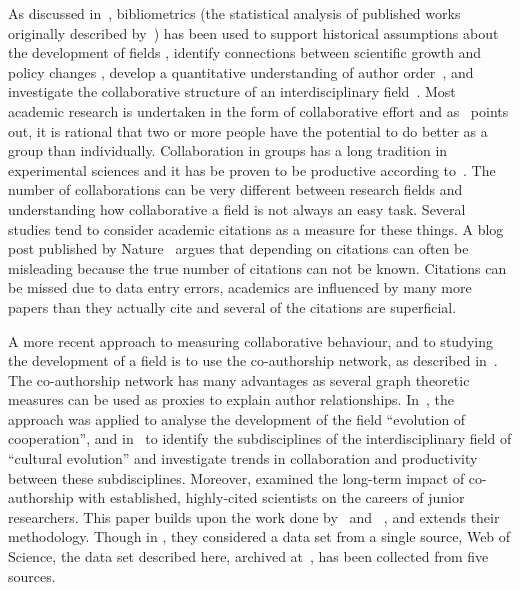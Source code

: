 \documentclass{article}
\theoremstyle{definition}
\begin{document}
As discussed in~\cite{youngblood2018}, bibliometrics (the statistical analysis
of published works originally described by~\cite{pritchard1969}) has been used
to support historical assumptions about the development of fields
\cite{raina1998}, identify connections between scientific growth and policy
changes \cite{das2016}, develop a quantitative understanding of author
order~\cite{sekara2018}, and investigate the collaborative structure of an
interdisciplinary field~\cite{Liu2015}. Most academic research is undertaken in
the form of collaborative effort and as~\cite{Kyvik2017} points out, it is
rational that two or more people have the potential to do better as a group
than individually. Collaboration in groups has a long tradition in experimental
sciences and it has be proven to be productive according
to~\cite{Etzkowitz1992}. The number of collaborations can be very different
between research fields and understanding how collaborative a field is not
always an easy task. Several studies tend to consider academic citations as a
measure for these things. A blog post published by Nature~\cite{nature_blog}
argues that depending on citations can often be misleading because the true
number of citations can not be known. Citations can be missed due to data entry
errors, academics are influenced by many more papers than they actually cite and
several of the citations are superficial.

A more recent approach to measuring collaborative behaviour, and to studying the
development of a field is to use the co-authorship network, as described
in~\cite{Liu2015}. The co-authorship network has many advantages as several
graph theoretic measures can be used as proxies to explain author relationships.
In~\cite{Liu2015}, the approach was applied to analyse the development of the field
``evolution of cooperation'', and in~\cite{youngblood2018} to identify the
subdisciplines of the interdisciplinary field of ``cultural evolution'' and
investigate trends in collaboration and productivity between these subdisciplines.
Moreover, \cite{Li2019} examined the
long-term impact of co-authorship with established, highly-cited scientists on
the careers of junior researchers. This paper builds upon the work done
by~\cite{Liu2015} and ~\cite{youngblood2018}, and extends their methodology.
Though in \cite{Liu2015, youngblood2018}, they considered a data set from a
single source, Web of Science, the data set described here, archived
at~\cite{pd_data_2018}, has been collected from five sources.
\end{document}
